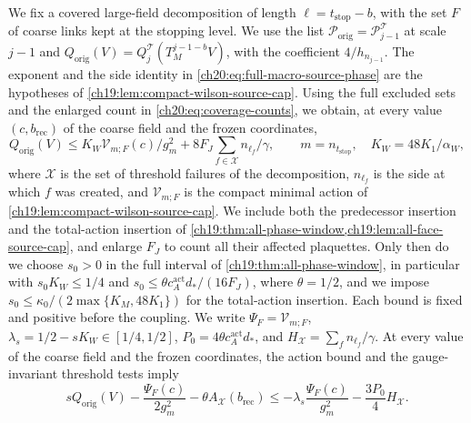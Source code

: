 We fix a covered large-field decomposition of length $\ell=t_{\mathrm{stop}}-b$, with the set $F$ of coarse links kept at the stopping level. We use the list $\mathcal P_{\mathrm{orig}}=\mathcal P_{j-1}^{\mathcal T}$ at scale $j-1$ and $Q_{\mathrm{orig}}(V)=Q_j^{\mathcal T}(T_M^{j-1-b}V)$, with the coefficient $4/h_{n_{j-1}}$. The exponent and the side identity in \eqref{ch20:eq:full-macro-source-phase} are the hypotheses of \cref{ch19:lem:compact-wilson-source-cap}. Using the full excluded sets and the enlarged count in \eqref{ch20:eq:coverage-counts}, we obtain, at every value $(c,b_{\mathrm{rec}})$ of the coarse field and the frozen coordinates,
\begin{equation}\label{ch20:eq:compact-source-cap}
 Q_{\mathrm{orig}}(V)\le K_W\mathcal V_{m;F}(c)/g_m^2+8F_J\sum_{f\in\mathcal X}n_{\ell_f}/\gamma,\qquad m=n_{t_{\mathrm{stop}}},\quad K_W=48K_1/\alpha_W,
\end{equation}
where $\mathcal X$ is the set of threshold failures of the decomposition, $n_{\ell_f}$ is the side at which $f$ was created, and $\mathcal V_{m;F}$ is the compact minimal action of \cref{ch19:lem:compact-wilson-source-cap}. We include both the predecessor insertion and the total-action insertion of \cref{ch19:thm:all-phase-window,ch19:lem:all-face-source-cap}, and enlarge $F_J$ to count all their affected plaquettes. Only then do we choose $s_0>0$ in the full interval of \cref{ch19:thm:all-phase-window}, in particular with $s_0K_W\le1/4$ and $s_0\le\theta c_A^{\mathrm{act}}d_*/(16F_J)$, where $\theta=1/2$, and we impose $s_0\le\kappa_0/(2\max\{K_M,48K_1\})$ for the total-action insertion. Each bound is fixed and positive before the coupling. We write $\Psi_F=\mathcal V_{m;F}$, $\lambda_s=1/2-sK_W\in[1/4,1/2]$, $P_0=4\theta c_A^{\mathrm{act}}d_*$, and $H_{\mathcal X}=\sum_fn_{\ell_f}/\gamma$. At every value of the coarse field and the frozen coordinates, the action bound and the gauge-invariant threshold tests imply
\begin{equation}\label{ch20:eq:compact-source-budget}
 sQ_{\mathrm{orig}}(V)-\frac{\Psi_F(c)}{2g_m^2}-\theta A_{\mathcal X}(b_{\mathrm{rec}})\le-\lambda_s\frac{\Psi_F(c)}{g_m^2}-\frac{3P_0}4H_{\mathcal X}.
\end{equation}
